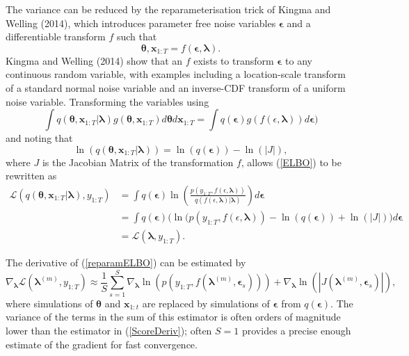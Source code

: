 \documentclass[12pt,a4paper]{article}%
\numberwithin{equation}{section}
\begin{document}
The variance can be reduced by the reparameterisation trick of Kingma and Welling (2014), which introduces parameter free noise variables $\boldsymbol{\epsilon}$ and a differentiable transform $f$ such that
\begin{equation}
\label{Reparam}
\boldsymbol{\theta}, \textbf{x}_{1:T} = f(\boldsymbol{\epsilon}, \boldsymbol{\lambda}).
\end{equation}
Kingma and Welling (2014) show that an $f$ exists to transform $\boldsymbol{\epsilon}$ to any continuous random variable, with examples including a location-scale transform of a standard normal noise variable and an inverse-CDF transform of a uniform noise variable. Transforming the variables using
\begin{equation}
\label{changevar}
\int q(\boldsymbol{\theta}, \textbf{x}_{1:T} | \boldsymbol{\lambda}) g(\boldsymbol{\theta}, \textbf{x}_{1:T})  d\boldsymbol{\theta}d\textbf{x}_{1:T} = \int q(\boldsymbol{\epsilon}) g ( f (\epsilon, \boldsymbol{\lambda})) d\boldsymbol{\epsilon})
\end{equation}
and noting that
\begin{equation}
\label{ReparamDist}
\ln(q(\boldsymbol{\theta}, \textbf{x}_{1:T} | \boldsymbol{\lambda})) = \ln(q(\boldsymbol{\epsilon})) - \ln(|J|),
\end{equation}
where $J$ is the Jacobian Matrix of the transformation $f$, allows (\ref{ELBO}) to be rewritten as
\begin{align}
\label{reparamELBO}
\mathcal{L}(q(\boldsymbol{\theta}, \textbf{x}_{1:T} | \boldsymbol{\lambda}), y_{1:T}) &=  \int  q(\boldsymbol{\epsilon}) \ln \left( \frac{p(y_{1:T}, f (\epsilon, \boldsymbol{\lambda}))}{q( f (\epsilon, \boldsymbol{\lambda}) | \boldsymbol{\lambda})} \right) d\boldsymbol{\epsilon} \nonumber \\
&= \int  q(\boldsymbol{\epsilon}) \big( \ln (p(y_{1:T}, f (\epsilon, \boldsymbol{\lambda})) - \ln(q(\boldsymbol{\epsilon})) + \ln(|J|) \big) d\boldsymbol{\epsilon} \nonumber \\
&= \mathcal{L}(\boldsymbol{\lambda}, y_{1:T}).
\end{align}

The derivative of (\ref{reparamELBO}) can be estimated by
\begin{equation}
\label{ReparamDeriv}
\nabla_{\boldsymbol{\lambda}}\mathcal{L}(\boldsymbol{\lambda}^{(m)}, y_{1:T}) \approx \frac{1}{S}\sum_{s=1}^{S} \nabla_{\boldsymbol{\lambda}} \ln (p(y_{1:T}, f(\boldsymbol{\lambda}^{(m)}, \boldsymbol{\epsilon}_s))) + \nabla_{\boldsymbol{\lambda}}\ln(|J(\boldsymbol{\lambda}^{(m)}, \boldsymbol{\epsilon}_s)|),
\end{equation}
where simulations of $\boldsymbol{\theta}$ and $\textbf{x}_{1:t}$ are replaced by simulations of $\boldsymbol{\epsilon}$ from $q(\boldsymbol{\epsilon})$. The variance of the terms in the sum of this estimator is often orders of magnitude lower than the estimator in (\ref{ScoreDeriv}); often $S = 1$ provides a precise enough estimate of the gradient for fast convergence.
\end{document}
